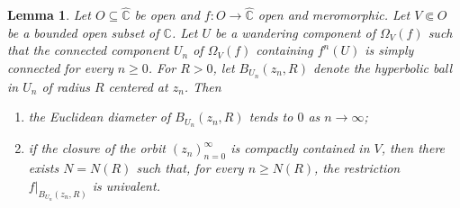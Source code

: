 \documentclass[12pt,a4paper,reqno]{amsart}
\theoremstyle{plain}
\newtheorem{lem}[thm]{Lemma}
\renewcommand{\subset}{\subseteq}
\theoremstyle{definition}
\theoremstyle{remark}
\numberwithin{equation}{section}
\newcommand \C{\mathbb{C}}
\newcommand \Ch{\widehat{\mathbb{C}}}
\begin{document}
\begin{lem}\label{lem:sph diameters and injectivity}
    Let $O\subset\Ch$ be open and $f\colon O\to\Ch$ open and meromorphic. Let $V\Subset O$ be a bounded open subset of $\C$. Let $U$ be a wandering component of $\Omega_V(f)$ such that the connected component $U_n$ of $\Omega_V(f)$ containing $f^n(U)$ is simply connected for every $n \geq 0$.
    For $R > 0$, let $B_{U_n}(z_n,R)$ denote the hyperbolic ball in $U_n$ of radius $R$ centered at $z_n$. Then
    \begin{enumerate}[(1)]
        \item\label{it:sph diameters to zero} the Euclidean diameter of $B_{U_n}(z_n,R)$ tends to $0$ as $n \to \infty$;
        \item\label{it:injectivity} if the closure of the orbit $(z_n)_{n=0}^{\infty}$ is compactly contained in $V$, then there exists $N = N(R)$ such that, for every $n \geq N(R)$, the restriction $f|_{B_{U_n}(z_n,R)}$ is univalent.
    \end{enumerate}
\end{lem}
\end{document}
